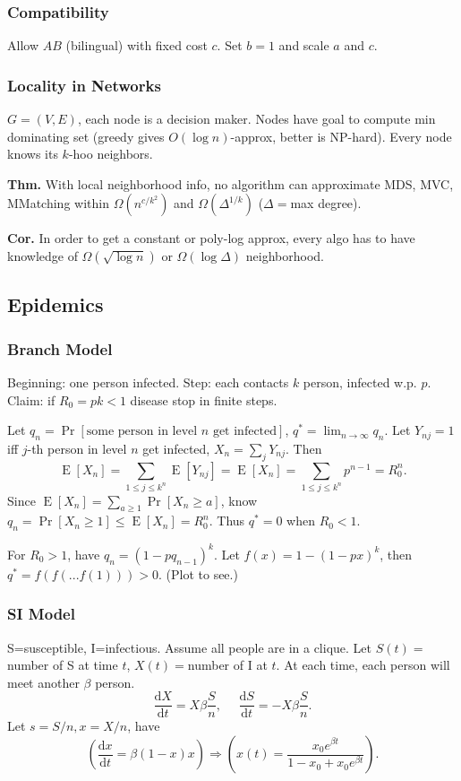\documentclass[a4paper,twocolumn,10pt]{article}
\newcommand{\pte}[1]{\left({#1}\right)}
\newcommand{\E}{\operatorname{E}}
\newcommand{\dd}{\mathrm{d}}
\begin{document}
	\subsubsection{Compatibility}
		Allow $AB$ (bilingual) with fixed cost $c$.
		Set $b=1$ and scale $a$ and $c$.
	
	\subsubsection{Locality in Networks}
		$G=(V,E)$, each node is a decision maker.
		Nodes have goal to compute min dominating set (greedy gives $O(\log n)$-approx,
			better is NP-hard).
		Every node knows its $k$-hoo neighbors.

		\textbf{Thm.}
		With local neighborhood info, no algorithm can approximate
			MDS, MVC, MMatching within $\Omega(n^{c/k^2})$ and $\Omega(\Delta^{1/k})$
			($\Delta=$max degree).

		\textbf{Cor.}
		In order to get a constant or poly-log approx, every algo has to  have knowledge
			of $\Omega(\sqrt{\log n})$ or $\Omega(\log \Delta)$ neighborhood.

\subsection{Epidemics}
	\subsubsection{Branch Model}
		Beginning: one person infected.
		Step: each contacts $k$ person, infected w.p. $p$.
		Claim: if $R_0=pk<1$ disease stop in finite steps.
		
		Let $q_n=\Pr[\textrm{some person in level $n$ get infected}]$,
		$q^*=\lim_{n\to\infty} q_n$.
		Let $Y_{nj}=1$ iff $j$-th person in level $n$ get infected,
			$X_n=\sum_j Y_{nj}$.
		Then 
		\[
			\E[X_n]=\sum_{1\le j\le k^{n}} \E[Y_{nj}]=
			\E[X_n]=\sum_{1\le j\le k^{n}} p^{n-1} = R_0^{n}.
		\]
		Since $\E[X_n]=\sum_{a\ge 1} \Pr[X_n\ge a]$,
			know $q_n=\Pr[X_n\ge 1]\le \E[X_n]=R_0^n$.
		Thus $q^*=0$ when $R_0<1$.
		
		For $R_0>1$, have $q_n=(1-p q_{n-1})^k$.
		Let $f(x)=1-(1-px)^k$, then $q^*=f(f(...f(1)))>0$. (Plot to see.)
	
	\subsubsection{SI Model}
		S=susceptible, I=infectious.
		Assume all people are in a clique.
		Let $S(t)=$number of S at time $t$, $X(t)=$number of I at $t$.
		At each time, each person will meet another $\beta$ person.
		\[
			\frac{\dd X}{\dd t} = X \beta \frac{S}{n},
			\textrm{~~~~}
			\frac{\dd S}{\dd t} = -X \beta \frac{S}{n}.
		\]
		Let $s=S/n,x=X/n$, have
		\[
			\pte{\frac{\dd x}{\dd t} = \beta(1-x)x}
			\Longrightarrow
			\pte{x(t)=\frac{x_0 e^{\beta t}}{1-x_0+x_0 e^{\beta t}}}.
		\]
	
\end{document}
